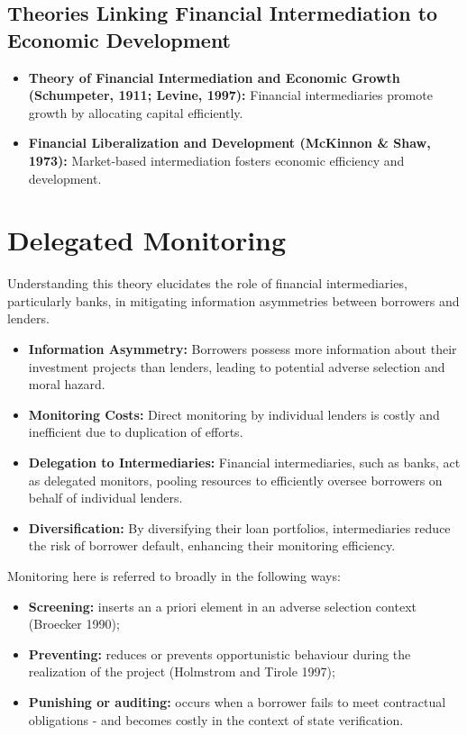 \subsection{Theories Linking Financial Intermediation to Economic Development}
\begin{itemize}
    \item \textbf{Theory of Financial Intermediation and Economic Growth (Schumpeter, 1911; Levine, 1997):} Financial intermediaries promote growth by allocating capital efficiently.
    \item \textbf{Financial Liberalization and Development (McKinnon \& Shaw, 1973):} Market-based intermediation fosters economic efficiency and development.
\end{itemize}

\section{Delegated Monitoring}

Understanding this theory elucidates the role of financial intermediaries, particularly banks, in mitigating information asymmetries between borrowers and lenders.

\begin{itemize}
    \item \textbf{Information Asymmetry:} Borrowers possess more information about their investment projects than lenders, leading to potential adverse selection and moral hazard.
    \item \textbf{Monitoring Costs:} Direct monitoring by individual lenders is costly and inefficient due to duplication of efforts.
    \item \textbf{Delegation to Intermediaries:} Financial intermediaries, such as banks, act as delegated monitors, pooling resources to efficiently oversee borrowers on behalf of individual lenders.
    \item \textbf{Diversification:} By diversifying their loan portfolios, intermediaries reduce the risk of borrower default, enhancing their monitoring efficiency.
\end{itemize}

Monitoring here is referred to broadly in the following ways:
\begin{itemize}
    \item \textbf{Screening:} inserts an a priori element in an adverse selection context (Broecker 1990);
    \item \textbf{Preventing:} reduces or prevents opportunistic behaviour during the realization of the project (Holmstrom and Tirole 1997);
    \item \textbf{Punishing or auditing:} occurs when a borrower fails to meet contractual obligations - and becomes costly in the context of state verification.
\end{itemize}

